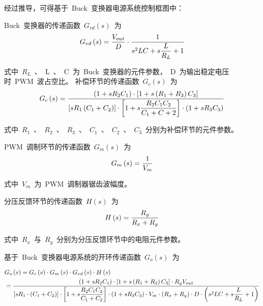 经过推导，可得基于~Buck~变换器电源系统控制框图中：

Buck~变换器的传递函数~$G_{vd}\left(s\right)$~为
\begin{equation}\label{equ:chap5:Index1}
  G_{vd}\left(s\right)=\displaystyle\frac{V_{out}}{D}\cdot\displaystyle\frac{1}{s^2LC+{s}\displaystyle\frac{L}{R_L}+1}
\end{equation}

式中~$R_L$~、~L~、~C~为~Buck~变换器的元件参数，~D~为输出稳定电压时~PWM~波占空比。
补偿环节的传递函数~$G_c\left(s\right)$~为
\begin{equation}\label{equ:chap5:Index2}
  G_{c}\left(s\right)=\displaystyle\frac{\left(1+sR_2C_1\right)\cdot\left[1+s\left(R_1+R_3\right)C_3\right]}{\left[sR_1\left(C_1+C_2\right)\right]\cdot\left[1+s\displaystyle\frac{R_2C_1C_2}{C_1+C+2}\right]\cdot\left(1+sR_3C_3\right)}
\end{equation}

式中~$R_1$~、~$R_2$~、~$R_3$~、~$C_1$~、~$C_2$~、~$C_3$~分别为补偿环节的元件参数。

PWM~调制环节的传递函数~$G_m\left(s\right)$~为
\begin{equation}\label{equ:chap5:Index3}
  G_{m}\left(s\right)=\displaystyle\frac{1}{V_m}
\end{equation}

式中~$V_m$~为~PWM~调制器锯齿波幅度。\\
\medskip

分压反馈环节的传递函数~$H\left(s\right)$~为
\begin{equation}\label{equ:chap5:Index4}
  H\left(s\right)=\displaystyle\frac{R_y}{R_x+R_y}
\end{equation}

式中~$R_x$~与~$R_y$~分别为分压反馈环节中的电阻元件参数。
\medskip

基于~Buck~变换器电源系统的开环传递函数~$G_o\left(s\right)$~为
\begin{small}
\begin{equation}\label{equ:chap5:Index5}
\begin{split}
 &  G_o\left(s\right) ={G_c\left(s\right)}\cdot{G_m\left(s\right)}\cdot{G_{vd}\left(s\right)}\cdot{H\left(s\right)} \\
     &=\displaystyle\frac{\left(1+sR_2C_1\right)\cdot\left[1+s\left(R_1+R_2\right)C_3\right]\cdot{R_yV_{out}}}{\left[{sR_1}\cdot\left(C_1+C_2\right)\right]\cdot\left[1+s\displaystyle\frac{R_2C_1C_2}{C_1+C_2}\right]\cdot\left(1+sR_3C_3\right)\cdot{V_m}\cdot\left(R_x+R_y\right)\cdot{D}\cdot\left(s^2LC+s\displaystyle\frac{L}{R_L}+1\right)}
\end{split}
\end{equation}
\end{small}

